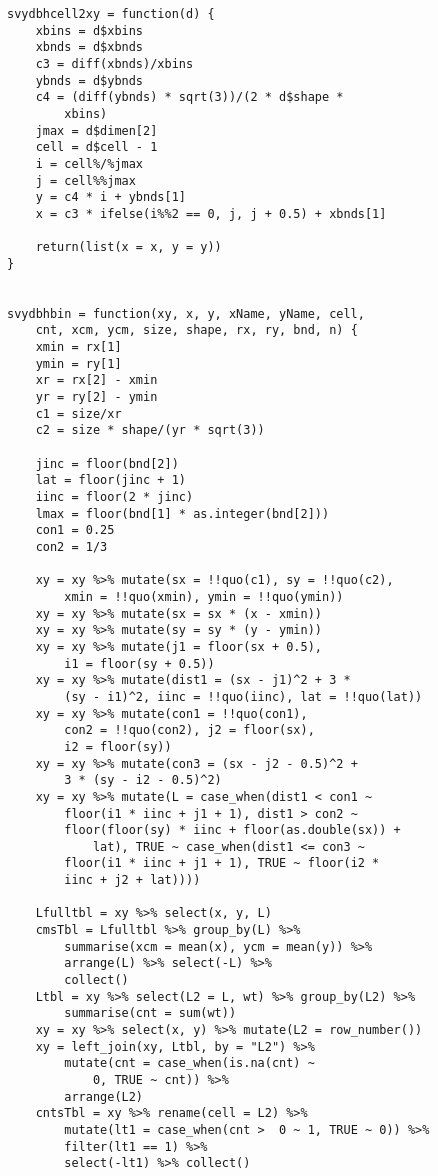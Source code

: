 \begin{lstlisting}
svydbhcell2xy = function(d) {
    xbins = d$xbins
    xbnds = d$xbnds
    c3 = diff(xbnds)/xbins
    ybnds = d$ybnds
    c4 = (diff(ybnds) * sqrt(3))/(2 * d$shape * 
        xbins)
    jmax = d$dimen[2]
    cell = d$cell - 1
    i = cell%/%jmax
    j = cell%%jmax
    y = c4 * i + ybnds[1]
    x = c3 * ifelse(i%%2 == 0, j, j + 0.5) + xbnds[1]
    
    return(list(x = x, y = y))
}


svydbhbin = function(xy, x, y, xName, yName, cell, 
    cnt, xcm, ycm, size, shape, rx, ry, bnd, n) {
    xmin = rx[1]
    ymin = ry[1]
    xr = rx[2] - xmin
    yr = ry[2] - ymin
    c1 = size/xr
    c2 = size * shape/(yr * sqrt(3))
    
    jinc = floor(bnd[2])
    lat = floor(jinc + 1)
    iinc = floor(2 * jinc)
    lmax = floor(bnd[1] * as.integer(bnd[2]))
    con1 = 0.25
    con2 = 1/3
    
    xy = xy %>% mutate(sx = !!quo(c1), sy = !!quo(c2), 
        xmin = !!quo(xmin), ymin = !!quo(ymin))
    xy = xy %>% mutate(sx = sx * (x - xmin))
    xy = xy %>% mutate(sy = sy * (y - ymin))
    xy = xy %>% mutate(j1 = floor(sx + 0.5), 
        i1 = floor(sy + 0.5))
    xy = xy %>% mutate(dist1 = (sx - j1)^2 + 3 * 
        (sy - i1)^2, iinc = !!quo(iinc), lat = !!quo(lat))
    xy = xy %>% mutate(con1 = !!quo(con1), 
        con2 = !!quo(con2), j2 = floor(sx), 
        i2 = floor(sy))
    xy = xy %>% mutate(con3 = (sx - j2 - 0.5)^2 + 
        3 * (sy - i2 - 0.5)^2)
    xy = xy %>% mutate(L = case_when(dist1 < con1 ~ 
        floor(i1 * iinc + j1 + 1), dist1 > con2 ~ 
        floor(floor(sy) * iinc + floor(as.double(sx)) + 
            lat), TRUE ~ case_when(dist1 <= con3 ~ 
        floor(i1 * iinc + j1 + 1), TRUE ~ floor(i2 * 
        iinc + j2 + lat))))
    
    Lfulltbl = xy %>% select(x, y, L)
    cmsTbl = Lfulltbl %>% group_by(L) %>% 
        summarise(xcm = mean(x), ycm = mean(y)) %>% 
        arrange(L) %>% select(-L) %>% 
        collect()
    Ltbl = xy %>% select(L2 = L, wt) %>% group_by(L2) %>% 
        summarise(cnt = sum(wt))
    xy = xy %>% select(x, y) %>% mutate(L2 = row_number())
    xy = left_join(xy, Ltbl, by = "L2") %>% 
        mutate(cnt = case_when(is.na(cnt) ~ 
            0, TRUE ~ cnt)) %>% 
        arrange(L2)
    cntsTbl = xy %>% rename(cell = L2) %>% 
        mutate(lt1 = case_when(cnt >  0 ~ 1, TRUE ~ 0)) %>% 
        filter(lt1 == 1) %>% 
        select(-lt1) %>% collect()
    

\end{lstlisting}
